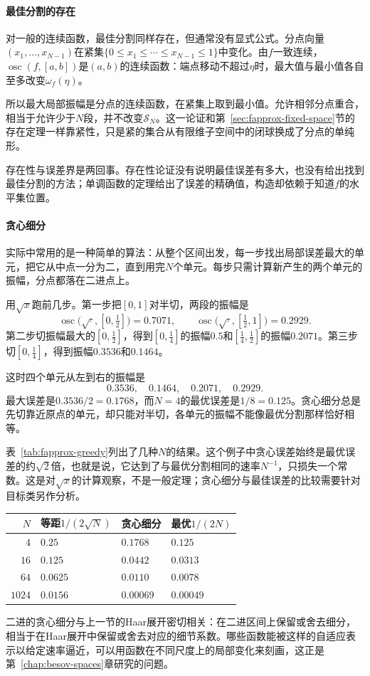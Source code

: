 \paragraph{最佳分割的存在}
对一般的连续函数，最佳分割同样存在，但通常没有显式公式。分点向量$(x_1,\ldots,x_{N-1})$在紧集$\{0\leq x_1\leq\cdots\leq x_{N-1}\leq1\}$中变化。由$f$一致连续，$\operatorname{osc}(f,[a,b])$是$(a,b)$的连续函数：端点移动不超过$\eta$时，最大值与最小值各自至多改变$\omega_f(\eta)$。

所以最大局部振幅是分点的连续函数，在紧集上取到最小值。允许相邻分点重合，相当于允许少于$N$段，并不改变$\mathcal S_N$。这一论证和第~\ref{sec:fapprox-fixed-space}节的存在定理一样靠紧性，只是紧的集合从有限维子空间中的闭球换成了分点的单纯形。

存在性与误差界是两回事。存在性论证没有说明最佳误差有多大，也没有给出找到最佳分割的方法；单调函数的定理给出了误差的精确值，构造却依赖于知道$f$的水平集位置。

\paragraph{贪心细分}
实际中常用的是一种简单的算法：从整个区间出发，每一步找出局部误差最大的单元，把它从中点一分为二，直到用完$N$个单元。每步只需计算新产生的两个单元的振幅，分点都落在二进点上。

用$\sqrt x$跑前几步。第一步把$[0,1]$对半切，两段的振幅是
\[
 \operatorname{osc}\bigl(\sqrt{\cdot},[0,\tfrac12]\bigr)=0.7071,\qquad
 \operatorname{osc}\bigl(\sqrt{\cdot},[\tfrac12,1]\bigr)=0.2929 .
\]
第二步切振幅最大的$[0,\frac12]$，得到$[0,\frac14]$的振幅$0.5$和$[\frac14,\frac12]$的振幅$0.2071$。第三步切$[0,\frac14]$，得到振幅$0.3536$和$0.1464$。

这时四个单元从左到右的振幅是
\[
 0.3536,\quad 0.1464,\quad 0.2071,\quad 0.2929 .
\]
最大误差是$0.3536/2=0.1768$，而$N=4$的最优误差是$1/8=0.125$。贪心细分总是先切靠近原点的单元，却只能对半切，各单元的振幅不能像最优分割那样恰好相等。

表~\ref{tab:fapprox-greedy}列出了几种$N$的结果。这个例子中贪心误差始终是最优误差的约$\sqrt2$倍，也就是说，它达到了与最优分割相同的速率$N^{-1}$，只损失一个常数。这是对$\sqrt x$的计算观察，不是一般定理；贪心细分与最佳误差的比较需要针对目标类另作分析。

\begin{BookInlineTable}
  \centering
  \caption{$\sqrt x$的分段常数逼近的一致误差}
  \label{tab:fapprox-greedy}
  \begin{tabular}{rlll}
    \toprule
    $N$ & 等距$1/(2\sqrt N)$ & 贪心细分 & 最优$1/(2N)$ \\
    \midrule
    $4$ & $0.25$ & $0.1768$ & $0.125$ \\
    $16$ & $0.125$ & $0.0442$ & $0.0313$ \\
    $64$ & $0.0625$ & $0.0110$ & $0.0078$ \\
    $1024$ & $0.0156$ & $0.00069$ & $0.00049$ \\
    \bottomrule
  \end{tabular}
\end{BookInlineTable}

二进的贪心细分与上一节的Haar展开密切相关：在二进区间上保留或舍去细分，相当于在Haar展开中保留或舍去对应的细节系数。哪些函数能被这样的自适应表示以给定速率逼近，可以用函数在不同尺度上的局部变化来刻画，这正是第~\ref{chap:besov-spaces}章研究的问题。
